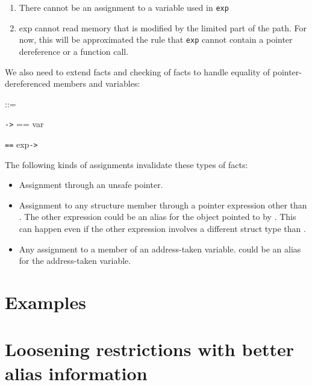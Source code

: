 \begin{enumerate}
\begin{enumerate}
    \begin{enumerate}
    \item
      There cannot be an assignment to a variable used in \texttt{exp}
    \item
      exp cannot read memory that is modified by the limited part of the
      path. For now, this will be approximated the rule that
      \texttt{exp} cannot contain a pointer dereference or a function
      call.
    \end{enumerate}
  \end{enumerate}
\end{enumerate}

We also need to extend facts and checking of facts to handle equality of
pointer-dereferenced members and variables:

 ::=

\texttt{-\textgreater{}} == var

 \texttt{==} exp\texttt{-\textgreater{}}

The following kinds of assignments invalidate these types of facts:

\begin{itemize}
\item
  Assignment through an unsafe pointer.
\item
  Assignment to any structure member through a pointer expression other
  than . The other expression could be an alias for the object
  pointed to by . This can happen even if the other expression
  involves a different struct type than .
\item
  Any assignment to a member of an address-taken variable. 
  could be an alias for the address-taken variable.
\end{itemize}

\section{Examples}\label{examples-1}
\section{Loosening restrictions with better alias information}
\label{section:better-alias-information}
